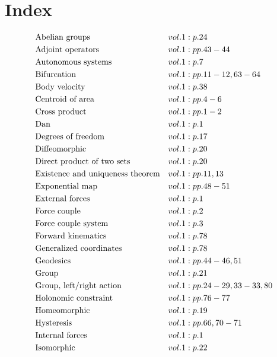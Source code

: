 \documentclass[a4paper]{article}
\begin{document}
 
\section*{Index} 
\allowdisplaybreaks 
\begin{align*} 
&\text{Abelian groups} \hfill&& vol. 1: p. 24\\
&\text{Adjoint operators} \hfill&& vol. 1: pp. 43-44\\
&\text{Autonomous systems} \hfill&& vol. 1: p. 7\\
&\text{Bifurcation} \hfill&& vol. 1: pp. 11-12, 63-64\\
&\text{Body velocity} \hfill&& vol. 1: p. 38\\
&\text{Centroid of area} \hfill&& vol. 1: pp. 4-6\\
&\text{Cross product} \hfill&& vol. 1: pp. 1-2\\
&\text{Dan} \hfill&& vol. 1: p. 1\\
&\text{Degrees of freedom} \hfill&& vol. 1: p. 17\\
&\text{Diffeomorphic} \hfill&& vol. 1: p. 20\\
&\text{Direct product of two sets} \hfill&& vol. 1: p. 20\\
&\text{Existence and uniqueness theorem} \hfill&& vol. 1: pp. 11, 13\\
&\text{Exponential map} \hfill&& vol. 1: pp. 48-51\\
&\text{External forces} \hfill&& vol. 1: p. 1\\
&\text{Force couple} \hfill&& vol. 1: p. 2\\
&\text{Force couple system} \hfill&& vol. 1: p. 3\\
&\text{Forward kinematics} \hfill&& vol. 1: p. 78\\
&\text{Generalized coordinates} \hfill&& vol. 1: p. 78\\
&\text{Geodesics} \hfill&& vol. 1: pp. 44-46, 51\\
&\text{Group} \hfill&& vol. 1: p. 21\\
&\text{Group, left/right action} \hfill&& vol. 1: pp. 24-29, 33-33, 80\\
&\text{Holonomic constraint} \hfill&& vol. 1: pp. 76-77\\
&\text{Homeomorphic} \hfill&& vol. 1: p. 19\\
&\text{Hysteresis} \hfill&& vol. 1: pp. 66, 70-71\\
&\text{Internal forces} \hfill&& vol. 1: p. 1\\
&\text{Isomorphic} \hfill&& vol. 1: p. 22\\

\end{align*}
\end{document}
